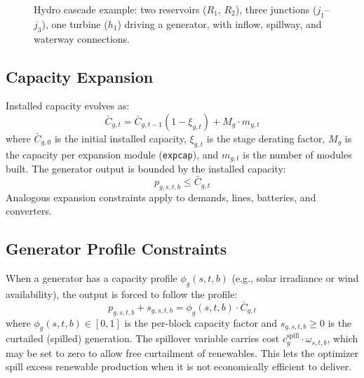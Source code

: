 \begin{figure}[t]
  \caption{Hydro cascade example: two reservoirs ($R_1$, $R_2$),
    three junctions ($j_1$--$j_3$), one turbine ($h_1$) driving a
    generator, with inflow, spillway, and waterway connections.}
  \label{fig:hydro_cascade}
\end{figure}

\subsection{Capacity Expansion}

Installed capacity evolves as:
\begin{equation}
\label{eq:capacity}
\bar{C}_{g,t} = \bar{C}_{g,t-1}(1-\xi_{g,t}) + M_g \cdot m_{g,t}
\end{equation}
where $\bar{C}_{g,0}$ is the initial installed capacity, $\xi_{g,t}$ is
the stage derating factor, $M_g$ is the capacity per expansion module
(\texttt{expcap}), and $m_{g,t}$ is the number of modules built.  The
generator output is bounded by the installed capacity:
\begin{equation}
p_{g,s,t,b} \leq \bar{C}_{g,t}
\end{equation}
Analogous expansion constraints apply to demands, lines, batteries, and
converters.

\subsection{Generator Profile Constraints}

When a generator has a capacity profile $\phi_g(s,t,b)$ (e.g., solar
irradiance or wind availability), the output is forced to follow the
profile:
\begin{equation}
\label{eq:profile}
p_{g,s,t,b} + s_{g,s,t,b} = \phi_g(s,t,b) \cdot \bar{C}_{g,t}
\end{equation}
where $\phi_g(s,t,b) \in [0,1]$ is the per-block capacity factor and
$s_{g,s,t,b} \geq 0$ is the curtailed (spilled) generation.  The
spillover variable carries cost $c_g^\text{spill} \cdot \omega_{s,t,b}$,
which may be set to zero to allow free curtailment of renewables.  This
lets the optimizer spill excess renewable production when it is not
economically efficient to deliver.

